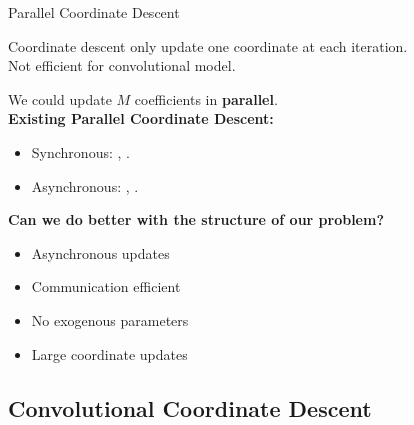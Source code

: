 \documentclass[prez_parietal.tex]{subfiles}
\begin{document}
\begin{frame}{Parallel Coordinate Descent}

	Coordinate descent only update one coordinate at each iteration.\\[.5em]
	{ Not efficient for convolutional model.\\[1.5em]}
	

	We could update $M$ coefficients in {\bf parallel}.\\[1.5em]
	
	{\bf Existing Parallel Coordinate Descent:}\\
	\begin{itemize}
		\item Synchronous: \cite{Scherrer2012}, \cite{Bradley2011}.
		\item Asynchronous: \cite{Yu2012}, \cite{Low2012}.
	\end{itemize}

	{\bf Can we do better with the structure of our problem?\\[1em]}
	\begin{itemize}
	\item Asynchronous updates
	\item Communication efficient
	\item No exogenous parameters
	\item Large coordinate updates
\end{itemize}

\end{frame}


\subsection{Convolutional Coordinate Descent}
\end{document}
